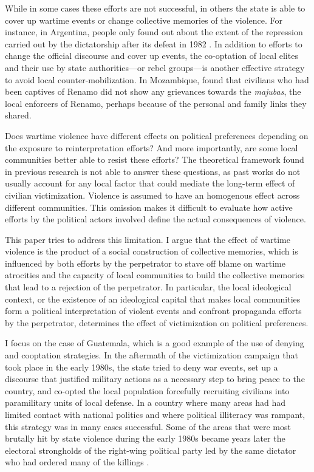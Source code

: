 \documentclass[12pt, notitlepage]{article}
\begin{document}
While in some cases these efforts are not successful, in others the state is able to cover up wartime events or change collective memories of the violence.
For instance, in Argentina, people only found out about the extent of the repression carried out by the dictatorship after its defeat in 1982 \citep{Robben:1995aa}.
In addition to efforts to change the official discourse and cover up events, the co-optation of local elites and their use by state authorities---or rebel groups---is another effective strategy to avoid local counter-mobilization.
In Mozambique, \citet{Finnegan:1992aa} found that civilians who had been captives of Renamo did not show any grievances towards the \textit{majubas}, the local enforcers of Renamo, perhaps because of the personal and family links they shared.

Does wartime violence have different effects on political preferences depending on the exposure to reinterpretation efforts?
And more importantly, are some local communities better able to resist these efforts?
The theoretical framework found in previous research is not able to answer these questions, as past works do not usually account for any local factor that could mediate the long-term effect of civilian victimization.
Violence is assumed to have an homogenous effect across different communities.
This omission makes it difficult to evaluate how active efforts by the political actors involved define the actual consequences of violence.

This paper tries to address this limitation.
I argue that the effect of wartime violence is the product of a social construction of collective memories, which is influenced by both efforts by the perpetrator to stave off blame on wartime atrocities and the capacity of local communities to build the collective memories that lead to a rejection of the perpetrator.
In particular, the local ideological context, or the existence of an ideological capital that makes local communities form a political interpretation of violent events and confront propaganda efforts by the perpetrator, determines the effect of victimization on political preferences.

I focus on the case of Guatemala, which is a good example of the use of denying and cooptation strategies.
In the aftermath of the victimization campaign that took place in the early 1980s, the state tried to deny war events, set up a discourse that justified military actions as a necessary step to bring peace to the country, and co-opted the local population forcefully recruiting civilians into paramilitary units of local defense.
In a country where many areas had had limited contact with national politics and where political illiteracy was rampant, this strategy was in many cases successful.
Some of the areas that were most brutally hit by state violence during the early 1980s became years later the electoral strongholds of the right-wing political party led by the same dictator who had ordered many of the killings \citep{Ball:1999ab}.
\end{document}
